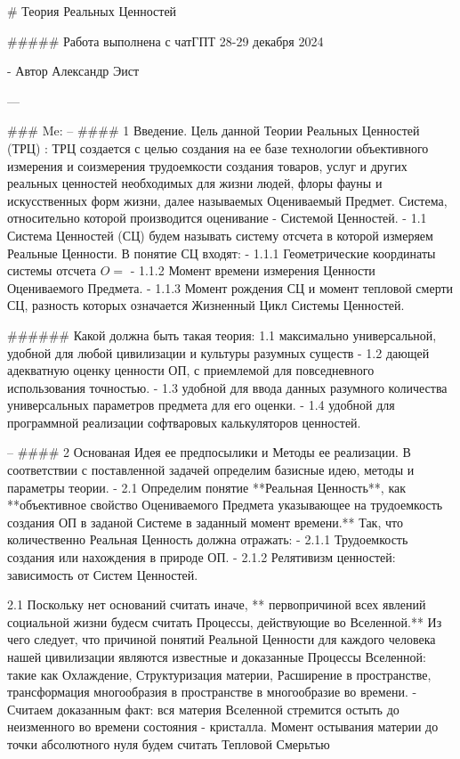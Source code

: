﻿# Теория Реальных Ценностей

##### Работа выполнена с чатГПТ 28-29 декабря 2024

- Автор Александр Эист 

---

### Me:
--  #### 1 Введение.
 Цель данной Теории Реальных Ценностей (ТРЦ) : ТРЦ создается с целью создания на ее базе технологии объективного измерения и соизмерения трудоемкости создания товаров, услуг и других реальных ценностей необходимых для жизни людей, флоры фауны и искусственных форм жизни, далее называемых Оцениваемый Предмет. Система, относительно которой производится оценивание - Системой Ценностей. 
-  1.1 Система Ценностей  (СЦ) будем называть систему отсчета в которой измеряем Реальные Ценности. В понятие СЦ входят:
-  1.1.1 Геометрические координаты системы отсчета \( O =  \)
-  1.1.2 Момент времени измерения Ценности Оцениваемого Предмета.
-  1.1.3 Момент рождения СЦ и момент тепловой смерти СЦ, разность которых означается Жизненный Цикл Системы Ценностей.      
 
###### Какой должна быть такая теория: 
1.1 максимально универсальной, удобной для любой цивилизации и культуры разумных существ 
-  1.2 дающей адекватную оценку ценности ОП, с приемлемой для повседневного использования точностью.
-  1.3 удобной для ввода данных разумного количества универсальных параметров предмета для его оценки. 
-  1.4 удобной для программной реализации софтваровых калькуляторов ценностей.
 
--  #### 2 Основаная Идея ее предпосылики и Методы ее реализации.
В соответствии с поставленной задачей определим базисные идею, методы и параметры теории.  
-  2.1 Определим понятие **Реальная Ценность**, как **объективное свойство Оцениваемого Предмета указывающее на трудоемкость создания ОП в заданой Системе в заданный момент времени.**  Так, что количественно Реальная Ценность должна отражать:
-  2.1.1 Трудоемкость создания или нахождения в природе ОП.
-  2.1.2 Релятивизм ценностей: зависимость от Систем Ценностей.

 

2.1 Поскольку нет оснований считать иначе, ** первопричиной всех явлений социальной жизни будесм считать Процессы, действующие во Вселенной.** Из чего следует, что причиной понятий Реальной Ценности для каждого человека нашей цивилизации являются известные и доказанные Процессы Вселенной: такие как Охлаждение, Структуризация материи, Расширение в пространстве, трансформация многообразия в пространстве в многообразие во времени. 
-  Считаем доказанным факт: вся материя Вселенной стремится остыть до неизменного во времени состояния - кристалла. Момент остывания материи до точки абсолютного нуля будем считать Тепловой Смерьтью 

